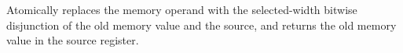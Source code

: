 Atomically replaces the memory operand with the selected-width bitwise disjunction of the old memory value and the source, and returns the old memory value in the source register.
